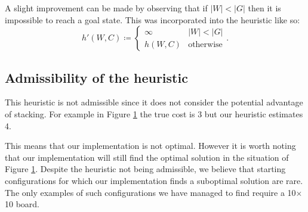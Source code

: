 \documentclass[11pt]{article}
\newcommand{\white}[3] {
  \foreach \x in {0, ..., #3} {
    \draw[fill=white] ({.5+#1},{\x*.1+.5+#2}) circle (0.42) node {#3};
  }
}
\newcommand{\black}[3] {
  \foreach \x in {0, ..., #3} {
    \draw[fill=white!70!black] ({.5+#1},{\x*.1+.5+#2}) circle (0.42) node {#3};
  }
}
\theoremstyle{definition}
\def\defeq{\coloneqq}
\begin{document}
    A slight improvement can be made by observing that if $|W| < |G|$ then it is impossible to reach a goal state. This was incorporated into the heuristic like so:
    \[
        h'(W, C) \defeq \begin{cases}
            \infty & |W| < |G|\\
            h(W, C) & \textrm{otherwise}
        \end{cases}. 
    \]

    \subsection{Admissibility of the heuristic}\label{subsec:admissibility-of-the-heuristic}
    This heuristic is not admissible since it does not consider the potential advantage of stacking. For example in Figure \ref{fig:inadmissable-heuristic} the true cost is $3$ but our heuristic estimates 4.
    \begin{figure}[ht!]
        \centering
        \caption{}
        \label{fig:inadmissable-heuristic}
    \end{figure}
    This means that our implementation is not optimal. However it is worth noting that our implementation will still find the optimal solution in the situation of Figure \ref{fig:inadmissable-heuristic}. Despite the heuristic not being admissible, we believe that starting configurations for which our implementation finds a suboptimal solution are rare. The only examples of such configurations we have managed to find require a 10$\times$10 board.
\end{document}

